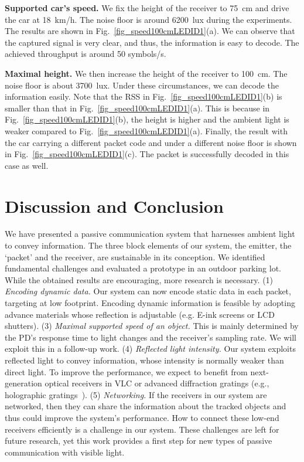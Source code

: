 \documentclass[10pt]{sig-alternate-05-2015}
\begin{document}
{\textbf{Supported car's speed.} We fix the height of the receiver to 75~cm and drive the car at 18~km/h. The noise floor is around 6200~lux during the experiments. The results are shown in Fig.~\ref{fig_speed100cmLEDID1}(a). We can observe that the captured signal is very clear, and thus, the information is easy to decode. The achieved throughput is around 50 symbols/s.

\textbf{Maximal height.} We then increase the height of the receiver to 100~cm. The noise floor is about 3700~lux. Under these circumstances, we can decode the information easily.  Note that the RSS in Fig.~\ref{fig_speed100cmLEDID1}(b)  is smaller than that in Fig.~\ref{fig_speed100cmLEDID1}(a). This is because in Fig.~\ref{fig_speed100cmLEDID1}(b), the height is higher and the ambient light is weaker compared to Fig.~\ref{fig_speed100cmLEDID1}(a). Finally, the result with the car carrying a different packet code and under a different noise floor is shown in Fig.~\ref{fig_speed100cmLEDID1}(c). The packet is successfully decoded in this case as well.


\section{Discussion and Conclusion} \label{sec_discu}

We have presented a passive communication system that harnesses ambient light to convey information. 
The three block elements of our system, the emitter, the `packet' and the receiver, are sustainable in its conception. We identified fundamental challenges and evaluated a prototype in an outdoor parking lot. While the obtained results are encouraging, more research is necessary. 
(1) \emph{Encoding dynamic data.} Our system can now encode static data in each packet, targeting at low footprint. Encoding dynamic information is feasible by adopting advance materials whose reflection is adjustable (e.g. E-ink screens or LCD shutters).
(3) \emph{Maximal supported speed of an object.} This is mainly determined by the PD's response time to light changes and the receiver's sampling rate. We will exploit this in a follow-up work.
(4) \emph{Reflected light intensity.} Our system exploits reflected light to convey information, whose intensity is normally weaker than direct light. To improve the performance, we expect to benefit from next-generation optical receivers in VLC or advanced diffraction gratings (e.g., holographic gratings~\cite{Yetisen2013}). (5) \emph{Networking.} If the receivers in our system are networked, then they can share the information about the tracked objects and thus could improve the system's performance. How to connect these low-end receivers efficiently is a challenge in our system. These challenges are left for future research, yet this work provides a first step for new types of  passive communication with visible light.


}
\end{document}
